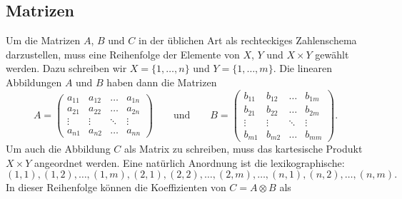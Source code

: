 \subsection{Matrizen
\label{buch:diskret:tensor:subsection:matrizen}}
Um die Matrizen $A$, $B$ und $C$ in der üblichen Art als rechteckiges
Zahlenschema darzustellen, muss eine Reihenfolge der Elemente von $X$,
$Y$ und $X\times Y$ gewählt werden.
Dazu schreiben wir $X=\{1,\dots,n\}$ und $Y=\{1,\dots,m\}$.
Die linearen Abbildungen $A$ und $B$ haben dann die Matrizen
\[
A
=
\begin{pmatrix}
a_{11}&a_{12}&\dots &a_{1n}\\
a_{21}&a_{22}&\dots &a_{2n}\\
\vdots&\vdots&\ddots&\vdots\\
a_{n1}&a_{n2}&\dots &a_{nn}
\end{pmatrix}
\qquad\text{und}\qquad
B
=
\begin{pmatrix}
b_{11}&b_{12}&\dots &b_{1m}\\
b_{21}&b_{22}&\dots &b_{2m}\\
\vdots&\vdots&\ddots&\vdots\\
b_{m1}&b_{m2}&\dots &b_{mm}
\end{pmatrix}.
\]
Um auch die Abbildung $C$ als Matrix zu schreiben, muss das kartesische
Produkt $X\times Y$ angeordnet werden.
Eine natürlich Anordnung ist die lexikographische:
\[
(1,1), (1,2),\dots,(1,m),(2,1),(2,2),\dots,(2,m),\dots,(n,1),(n,2),\dots,(n,m).
\]
In dieser Reihenfolge können die Koeffizienten von $C=A\otimes B$ als
\bgroup
\def\w{1.2}%
\def\h{0.8}%
\def\punkt#1#2{({(#2)*\w},{-(#1)*\h})}%
\def\Hdots#1#2{
	\foreach \y in {-0.2,0,0.2}{
		\fill \punkt{#1}{#2+(\y)/\w} circle[radius=0.02];
	}
}%
\def\Vdots#1#2{
	\foreach \x in {-0.2,0,0.2}{
		\fill \punkt{#1+(\x)/\h}{#2} circle[radius=0.02];
	}
}%
\def\Ddots#1#2{
	\foreach \u in {-0.2,0,0.2}{
		\fill \punkt{#1+(\u)/\h}{#2+(\u)/\w} circle[radius=0.02];
	}
}%
